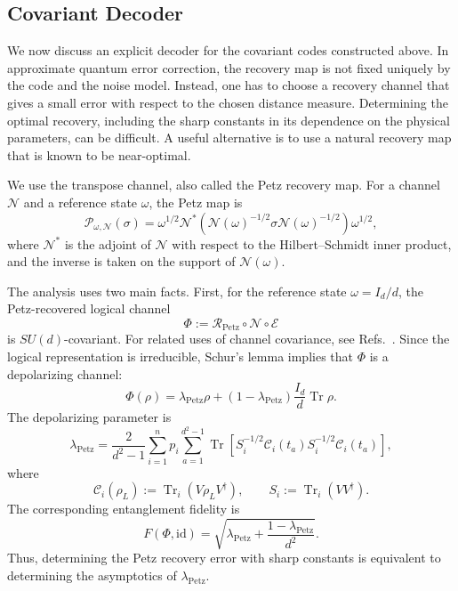 \documentclass[10pt,twocolumn,superscriptaddress,aps,amsmath,amssymb,citeautoscript,floatfix,prx,longbibliography]{revtex4-2}
\theoremstyle{plain}
\theoremstyle{plain}
\theoremstyle{plain}
\theoremstyle{plain}
\theoremstyle{plain}
\theoremstyle{plain}
\begin{document}
\subsection{Covariant Decoder}\label{subsec:main_decoder}

We now discuss an explicit decoder for the covariant codes constructed above. In approximate quantum error correction, the recovery map is not fixed uniquely by the code and the noise model. Instead, one has to choose a recovery channel that gives a small error with respect to the chosen distance measure. Determining the optimal recovery, including the sharp constants in its dependence on the physical parameters, can be difficult. A useful alternative is to use a natural recovery map that is known to be near-optimal.

We use the transpose channel, also called the Petz recovery map. For a channel $\mathcal N$ and a reference state $\omega$, the Petz map is
$$
    \mathcal P_{\omega,\mathcal N}(\sigma)
    =
    \omega^{1/2}
    \mathcal N^*
    \left(
        \mathcal N(\omega)^{-1/2}
        \sigma
        \mathcal N(\omega)^{-1/2}
    \right)
    \omega^{1/2},
$$
where $\mathcal N^*$ is the adjoint of $\mathcal N$ with respect to the Hilbert--Schmidt inner product, and the inverse is taken on the support of $\mathcal N(\omega)$.

The analysis uses two main facts. First, for the reference state $\omega=I_d/d$, the Petz-recovered logical channel
$$
    \Phi
    :=
    \mathcal R_{\mathrm{Petz}}
    \circ
    \mathcal N
    \circ
    \mathcal E
$$
is $SU(d)$-covariant. For related uses of channel covariance, see Refs.~\cite{Zhou2021, Alexander2025}. Since the logical representation is irreducible, Schur's lemma implies that $\Phi$ is a depolarizing channel:
$$
    \Phi(\rho)
    =
    \lambda_{\mathrm{Petz}}\rho
    +
    \left(1-\lambda_{\mathrm{Petz}}\right)
    \frac{I_d}{d}\operatorname{Tr}\rho .
$$
The depolarizing parameter is
\begin{equation}\label{eq:lambda_P}
    \lambda_{\mathrm{Petz}}
    =
    \frac{2}{d^2-1}
    \sum_{i=1}^n p_i
    \sum_{a=1}^{d^2-1}
    \operatorname{Tr}
    \left[
        S_i^{-1/2}
        \mathcal C_i(t_a)
        S_i^{-1/2}
        \mathcal C_i(t_a)
    \right],
\end{equation}
where
$$
    \mathcal C_i(\rho_L)
    :=
    \operatorname{Tr}_i\left(V\rho_LV^\dagger\right),
    \qquad
    S_i
    :=
    \operatorname{Tr}_i\left(VV^\dagger\right).
$$
The corresponding entanglement fidelity is
$$
    F(\Phi,\mathrm{id})
    =
    \sqrt{
        \lambda_{\mathrm{Petz}}
        +
        \frac{1-\lambda_{\mathrm{Petz}}}{d^2}
    } .
$$
Thus, determining the Petz recovery error with sharp constants is equivalent to determining the asymptotics of $\lambda_{\mathrm{Petz}}$.
\end{document}
